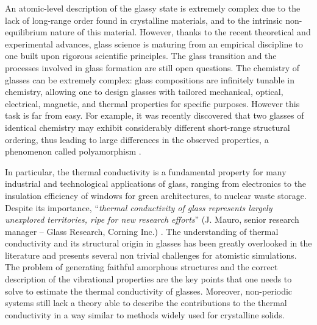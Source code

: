 An atomic-level description of the glassy state is extremely complex due to the lack of long-range order found in crystalline materials, and to the intrinsic non-equilibrium nature of this material. However, thanks to the recent theoretical and experimental advances, glass science is maturing from an empirical discipline to one built upon rigorous scientific principles. 
The glass transition and the processes involved in glass formation are still open questions. 
The chemistry of glasses can be extremely complex: glass compositions are infinitely tunable in chemistry, allowing one to design glasses with tailored mechanical, optical, electrical, magnetic, and thermal properties for specific purposes. 
However this task is far from easy. For example, it was recently discovered that two glasses of identical chemistry may exhibit considerably different short-range structural ordering, thus leading to large differences in the observed properties, a phenomenon called polyamorphism \cite{Huang2004,McMillan2004}. 

In particular, the thermal conductivity is a fundamental property for many industrial and technological applications of glass, ranging from electronics to the insulation efficiency of windows for green architectures, to nuclear waste storage. Despite its importance, ``\emph{thermal conductivity of glass represents largely unexplored territories, ripe for new research efforts}'' (J. Mauro, senior research manager -- Glass Research, Corning Inc.) \cite{MauroFM14}. 
The understanding of thermal conductivity and its structural origin in glasses has been greatly overlooked in the literature and presents several non trivial challenges for atomistic simulations. 
The problem of generating faithful amorphous structures and the correct description of the vibrational properties are the key points that one needs to solve to estimate the thermal conductivity of glasses. 
Moreover, non-periodic systems still lack a theory able to describe the contributions to the thermal conductivity in a way similar to methods widely used for crystalline solids. 



